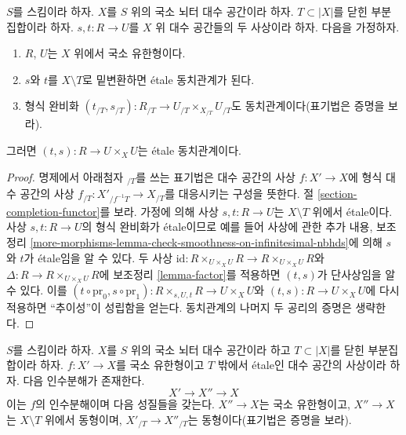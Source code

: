 \begin{lemma}
\label{lemma-equivalence-relation}
$S$를 스킴이라 하자. $X$를 $S$ 위의 국소 뇌터 대수 공간이라 하자.
$T \subset |X|$를 닫힌 부분집합이라 하자.
$s, t : R \to U$를 $X$ 위 대수 공간들의 두 사상이라 하자.
다음을 가정하자.
\begin{enumerate}
\item $R$, $U$는 $X$ 위에서 국소 유한형이다.
\item $s$와 $t$를 $X \setminus T$로 밑변환하면
\'etale 동치관계가 된다.
\item 형식 완비화
$(t_{/T}, s_{/T}) : R_{/T} \to U_{/T} \times_{X_{/T}} U_{/T}$도
동치관계이다(표기법은 증명을 보라).
\end{enumerate}
그러면 $(t, s) : R \to U \times_X U$는 \'etale 동치관계이다.
\end{lemma}

\begin{proof}
명제에서 아래첨자 $ {}_{/T}$를 쓰는 표기법은 대수 공간의 사상
$f : X' \to X$에 형식 대수 공간의 사상
$f_{/T} : X'_{/f^{-1}T} \to X_{/T}$를 대응시키는 구성을 뜻한다.
절 \ref{section-completion-functor}를 보라.
가정에 의해 사상 $s, t : R \to U$는 $X \setminus T$ 위에서
\'etale이다. 사상 $s, t : R \to U$의 형식 완비화가 \'etale이므로
예를 들어 사상에 관한 추가 내용, 보조정리
\ref{more-morphisms-lemma-check-smoothness-on-infinitesimal-nbhds}에 의해
$s$와 $t$가 \'etale임을 알 수 있다.
두 사상
$\text{id} : R \times_{U \times_X U} R \to R \times_{U \times_X U} R$와
$\Delta : R \to R \times_{U \times_X U} R$에
보조정리 \ref{lemma-factor}를 적용하면 $(t, s)$가 단사상임을 알 수 있다.
이를
$(t \circ \text{pr}_0, s \circ \text{pr}_1) :
R \times_{s, U, t} R \to U \times_X U$와
$(t, s) : R \to U \times_X U$에 다시 적용하면
“추이성”이 성립함을 얻는다. 동치관계의 나머지 두 공리의 증명은 생략한다.
\end{proof}

\begin{lemma}
\label{lemma-smash-away-from-T}
$S$를 스킴이라 하자. $X$를 $S$ 위의 국소 뇌터 대수 공간이라 하고
$T \subset |X|$를 닫힌 부분집합이라 하자.
$f : X' \to X$를 국소 유한형이고 $T$ 밖에서 \'etale인
대수 공간의 사상이라 하자. 다음 인수분해가 존재한다.
$$
X' \longrightarrow X'' \longrightarrow X
$$
이는 $f$의 인수분해이며 다음 성질들을 갖는다.
$X'' \to X$는 국소 유한형이고,
$X'' \to X$는 $X \setminus T$ 위에서 동형이며,
$X'_{/T} \to X''_{/T}$는 동형이다(표기법은 증명을 보라).
\end{lemma}

